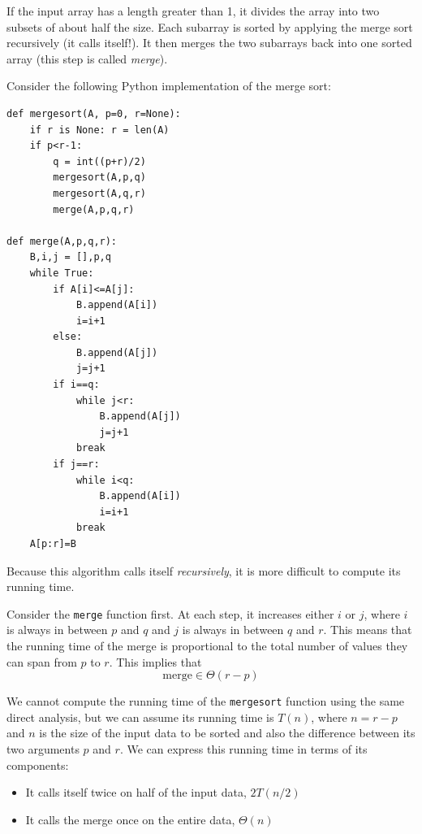 \documentclass[justified,sixbynine]{tufte-book}
\def\ft{\small\tt}
\theoremstyle{plain}%
\theoremstyle{definition}
\theoremstyle{remark}
\begin{document}
\begin{fullwidth}
If the input array has a length greater than 1, it divides the array into two subsets of about half the size. Each subarray is sorted by applying the merge sort recursively (it calls itself!). It then merges the two subarrays back into one sorted array (this step is called {\it merge}).

Consider the following Python implementation of the merge sort:

\begin{lstlisting}
def mergesort(A, p=0, r=None):
    if r is None: r = len(A)
    if p<r-1:
        q = int((p+r)/2)
        mergesort(A,p,q)
        mergesort(A,q,r)
        merge(A,p,q,r)

def merge(A,p,q,r):
    B,i,j = [],p,q
    while True:
        if A[i]<=A[j]:
            B.append(A[i])
            i=i+1
        else:
            B.append(A[j])
            j=j+1
        if i==q:
            while j<r:
                B.append(A[j])
                j=j+1
            break
        if j==r:
            while i<q:
                B.append(A[i])
                i=i+1
            break
    A[p:r]=B
\end{lstlisting}


Because this algorithm calls itself {\it recursively}, it is more difficult to compute its running time.

Consider the {\ft merge} function first. At each step, it increases either $i$ or $j$, where $i$ is always in between $p$ and $q$ and $j$ is always in between $q$ and $r$. This means that the running time of the merge is proportional to the total number of values they can span from $p$ to $r$. This implies that
\begin{equation}
\textrm{merge} \in \Theta(r-p)
\end{equation}

We cannot compute the running time of the {\ft mergesort} function using the same direct analysis, but we can assume its running time is $T(n)$, where $n=r-p$ and $n$ is the size of the input data to be sorted and also the difference between its two arguments $p$ and $r$. We can express this running time in terms of its components:
\begin{itemize}
\item It calls itself twice on half of the input data, $2T(n/2)$
\item It calls the merge once on the entire data, $\Theta(n)$
\end{itemize}


\end{fullwidth}
\end{document}
